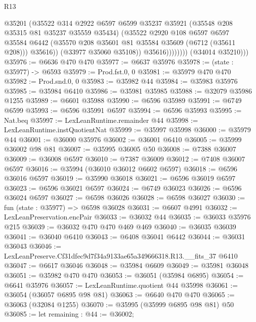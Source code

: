 \begin{lexlean}{R13}
\begin{coremodule}
                          @35201
                          (@35522
                            @314
                            @2922
                            @6597
                            @6599
                            @35237
                            @35921
                            (@35548 @208 @35315 @81 @35237 @35559 @35434)
                            (@35522
                              @2920
                              @108
                              @6597
                              @6597
                              @35584
                              @6442
                              (@35570 @208 @35601 @81 @35584 @35609 (@6712 (@35611 @208)))
                              @35616))
                          (@33977 @35060 @35108))
                        @35616))))))))
        (@34014 @35210)))
@35976 := @6636 @470 @470
@35977 := @6637 @35976
@35978 := (state : @35977) -> @6593
@35979 := Prod.fst.{0, 0}
@35981 := @35979 @470 @470
@35982 := Prod.snd.{0, 0}
@35983 := @35982 @44
@35984 := @35983 @35976
@35985 := @35984 @6410
@35986 := @35981 @35985
@35988 := @32079 @35986 @1255
@35989 := @6601 @35988
@35990 := @6596 @35989
@35991 := @6749 @6599
@35993 := @6596 @35991 @6597
@35994 := @6596 @35993
@35995 := Nat.beq
@35997 := LexLeanRuntime.remainder @44
@35998 := LexLeanRuntime.instQuotientNat
@35999 := @35997 @35998
@36000 := @35979 @44
@36001 := @36000 @35976
@36002 := @36001 @6410
@36005 := @35999 @36002 @98 @81
@36007 := @35995 @36005 @50
@36008 := @7388 @36007
@36009 := @36008 @6597
@36010 := @7387 @36009
@36012 := @7408 @36007 @6597
@36016 := @35994 (@36010 @36012 @6602 @6597)
@36018 := @6596 @36016 @6597
@36019 := @35990 @36018
@36021 := @6596 @36019 @6597
@36023 := @6596 @36021 @6597
@36024 := @6749 @36023
@36026 := @6596 @36024 @6597
@36027 := @6598 @36026
@36028 := @6598 @36027
@36030 := fun (state : @35977) => @6598 @36028
@36031 := @6607 @4991
@36032 := LexLeanPreservation.encPair
@36033 := @36032 @44
@36035 := @36033 @35976 @215
@36039 := @36032 @470 @470 @469 @469
@36040 := @36035 @36039
@36041 := @36040 @6410
@36043 := @6408 @36041 @6442
@36044 := @36031 @36043
@36046 := LexLeanPreserve.Cf31dfec9d7f34a9133ae65a349666318.R13.__fits_37 @6410
@36047 := @6617 @36046
@36048 := @35984 @6609
@36049 := @35981 @36048
@36051 := @35982 @470 @470
@36053 := @36051 (@35984 @6895)
@36054 := @6641 @35976
@36057 := LexLeanRuntime.quotient @44 @35998
@36061 := @36054 (@36057 @6895 @98 @81)
@36063 := @6640 @470 @470
@36065 := @36063 (@32084 @1255)
@36070 := @35995 (@35999 @6895 @98 @81) @50
@36085 := let remaining : @44 := @36002;

\end{coremodule}
\end{lexlean}
